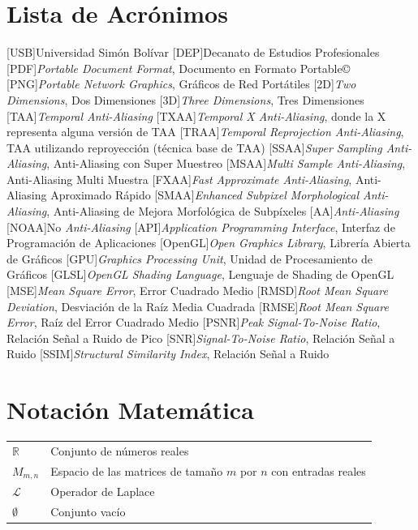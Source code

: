 \documentclass[pregrado]{tesis-usb} %
\begin{document}
\tableofcontents
\listoffigures
\listoftables

\chapter*{Lista de Acrónimos}
\begin{acronym}
	[USB]{Universidad Sim\'on Bol\'ivar}
	[DEP]{Decanato de Estudios Profesionales}
	[PDF]{\textit{Portable Document Format}, Documento en Formato Portable\copyright}
	[PNG]{\textit{Portable Network Graphics}, Gráficos de Red Portátiles}
	[2D]{\textit{Two Dimensions}, Dos Dimensiones}
	[3D]{\textit{Three Dimensions}, Tres Dimensiones}
	[TAA]{\textit{Temporal Anti-Aliasing}}
	[TXAA]{\textit{Temporal X Anti-Aliasing}, donde la X representa alguna versión de TAA}
	[TRAA]{\textit{Temporal Reprojection Anti-Aliasing}, TAA utilizando reproyección (técnica base de TAA)}
	[SSAA]{\textit{Super Sampling Anti-Aliasing}, Anti-Aliasing con Super Muestreo}
	[MSAA]{\textit{Multi Sample Anti-Aliasing}, Anti-Aliasing Multi Muestra}
	[FXAA]{\textit{Fast Approximate Anti-Aliasing}, Anti-Aliasing Aproximado Rápido}
	[SMAA]{\textit{Enhanced Subpixel Morphological Anti-Aliasing}, Anti-Aliasing de Mejora Morfológica de Subpíxeles}
	[AA]{\textit{Anti-Aliasing}}
	[NOAA]{No \textit{Anti-Aliasing}}
	[API]{\textit{Application Programming Interface}, Interfaz de Programación de Aplicaciones}
	[OpenGL]{\textit{Open Graphics Library}, Librería Abierta de Gráficos}
	[GPU]{\textit{Graphics Processing Unit}, Unidad de Procesamiento de Gráficos}
	[GLSL]{\textit{OpenGL Shading Language}, Lenguaje de Shading de OpenGL}
	[MSE]{\textit{Mean Square Error}, Error Cuadrado Medio}
	[RMSD]{\textit{Root Mean Square Deviation}, Desviación de la Raíz Media Cuadrada}
	[RMSE]{\textit{Root Mean Square Error}, Raíz del Error Cuadrado Medio}
	[PSNR]{\textit{Peak Signal-To-Noise Ratio}, Relación Señal a Ruido de Pico}
	[SNR]{\textit{Signal-To-Noise Ratio}, Relación Señal a Ruido}
	[SSIM]{\textit{Structural Similarity Index}, Relación Señal a Ruido}

\end{acronym}
\clearpage

\chapter*{Notación Matemática}
\begin{tabular}{ll}
	$\mathbb{R}$ & Conjunto de n\'umeros reales\\
	$M_{m,n}$ & Espacio de las matrices de tama\~no $m$ por $n$ con entradas reales\\
	$\mathcal{L}$ & Operador de Laplace\\
	$\emptyset$ & Conjunto vac\'io
\end{tabular}
\end{document}
